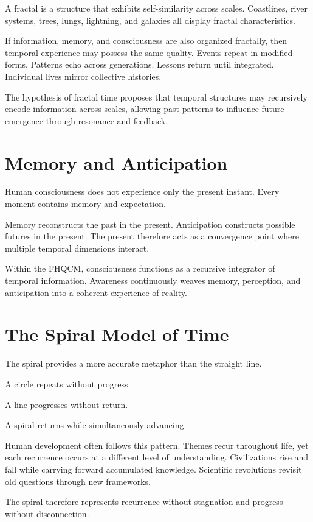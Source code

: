 A fractal is a structure that exhibits self-similarity across scales. Coastlines, river systems, trees, lungs, lightning, and galaxies all display fractal characteristics.

If information, memory, and consciousness are also organized fractally, then temporal experience may possess the same quality. Events repeat in modified forms. Patterns echo across generations. Lessons return until integrated. Individual lives mirror collective histories.

The hypothesis of fractal time proposes that temporal structures may recursively encode information across scales, allowing past patterns to influence future emergence through resonance and feedback.

\section{Memory and Anticipation}

Human consciousness does not experience only the present instant. Every moment contains memory and expectation.

Memory reconstructs the past in the present. Anticipation constructs possible futures in the present. The present therefore acts as a convergence point where multiple temporal dimensions interact.

Within the FHQCM, consciousness functions as a recursive integrator of temporal information. Awareness continuously weaves memory, perception, and anticipation into a coherent experience of reality.

\section{The Spiral Model of Time}

The spiral provides a more accurate metaphor than the straight line.

A circle repeats without progress.

A line progresses without return.

A spiral returns while simultaneously advancing.

Human development often follows this pattern. Themes recur throughout life, yet each recurrence occurs at a different level of understanding. Civilizations rise and fall while carrying forward accumulated knowledge. Scientific revolutions revisit old questions through new frameworks.

The spiral therefore represents recurrence without stagnation and progress without disconnection.

